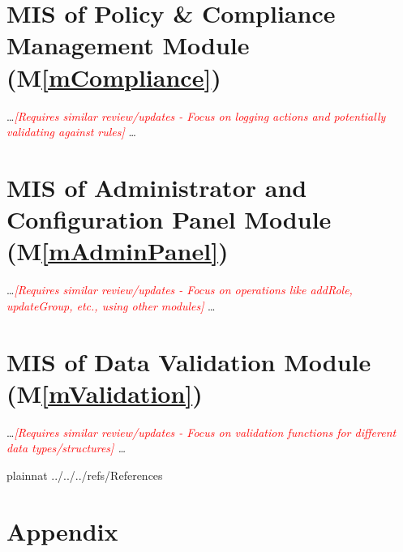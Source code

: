 \documentclass[12pt, titlepage]{article}
\providecommand{\mref}[1]{M\ref{#1}}
\begin{document}
\section{MIS of Policy \& Compliance Management Module (\mref{mCompliance})}
\dots \textit{\textcolor{red}{[Requires similar review/updates - Focus on logging actions and potentially validating against rules]}} \dots

\section{MIS of Administrator and Configuration Panel Module (\mref{mAdminPanel})}
\dots \textit{\textcolor{red}{[Requires similar review/updates - Focus on operations like addRole, updateGroup, etc., using other modules]}} \dots

\section{MIS of Data Validation Module (\mref{mValidation})}
\dots \textit{\textcolor{red}{[Requires similar review/updates - Focus on validation functions for different data types/structures]} \dots}

\newpage

 {plainnat}
 {../../../refs/References} %

\newpage

\appendix
\section*{Appendix}

\end{document}
